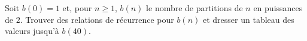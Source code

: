 Soit $b(0) = 1$ et, pour $n \geq 1$, $b(n)$ le nombre de partitions de $n$ en puissances de $2$. Trouver des relations de récurrence pour $b(n)$ et dresser un tableau des valeurs jusqu'à $b(40)$.
